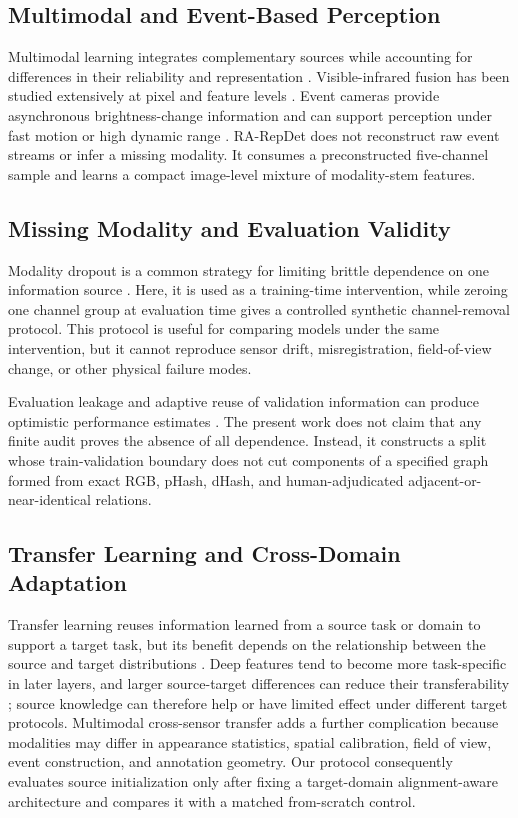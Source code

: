 \documentclass[pdflatex,sn-basic,Numbered,iicol]{sn-jnl}
\begin{document}
\subsection{Multimodal and Event-Based Perception}
Multimodal learning integrates complementary sources while accounting for differences in their reliability and representation \cite{baltrusaitis2019multimodal,ramachandram2017deep}. Visible-infrared fusion has been studied extensively at pixel and feature levels \cite{li2017pixel,ma2019surveyfusion,li2019densefuse}. Event cameras provide asynchronous brightness-change information and can support perception under fast motion or high dynamic range \cite{lichtsteiner2008sensor,gallego2022event,gehrig2021dsec}. RA-RepDet does not reconstruct raw event streams or infer a missing modality. It consumes a preconstructed five-channel sample and learns a compact image-level mixture of modality-stem features.

\subsection{Missing Modality and Evaluation Validity}
Modality dropout is a common strategy for limiting brittle dependence on one information source \cite{neverova2016moddrop}. Here, it is used as a training-time intervention, while zeroing one channel group at evaluation time gives a controlled synthetic channel-removal protocol. This protocol is useful for comparing models under the same intervention, but it cannot reproduce sensor drift, misregistration, field-of-view change, or other physical failure modes.

Evaluation leakage and adaptive reuse of validation information can produce optimistic performance estimates \cite{kapoor2023leakage,cawley2010overfitting}. The present work does not claim that any finite audit proves the absence of all dependence. Instead, it constructs a split whose train-validation boundary does not cut components of a specified graph formed from exact RGB, pHash, dHash, and human-adjudicated adjacent-or-near-identical relations.

\subsection{Transfer Learning and Cross-Domain Adaptation}
Transfer learning reuses information learned from a source task or domain to support a target task, but its benefit depends on the relationship between the source and target distributions \cite{pan2010transfer}. Deep features tend to become more task-specific in later layers, and larger source-target differences can reduce their transferability \cite{yosinski2014transfer}; source knowledge can therefore help or have limited effect under different target protocols. Multimodal cross-sensor transfer adds a further complication because modalities may differ in appearance statistics, spatial calibration, field of view, event construction, and annotation geometry. Our protocol consequently evaluates source initialization only after fixing a target-domain alignment-aware architecture and compares it with a matched from-scratch control.
\end{document}
